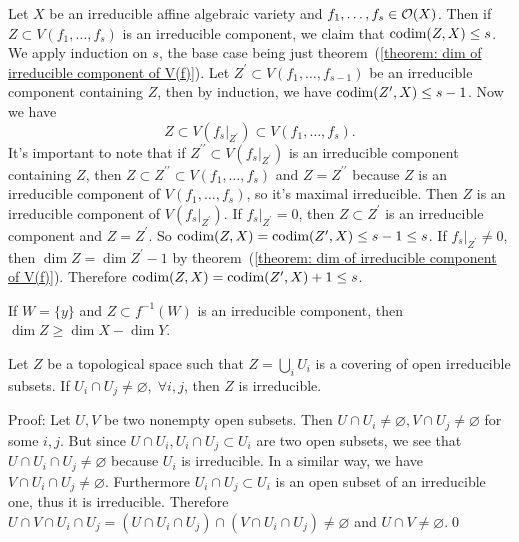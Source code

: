 \begin{remark}\label{remark: krull dimension generalized}
    Let $X$ be an irreducible affine algebraic variety and $f_1,\dots, f_s\in\mathcal{O}(X)$. Then if $Z\subset V(f_1,\dots, f_s)$
    is an irreducible component, we claim that $\text{codim}(Z,X)\leq s$. We apply induction on $s$, the base case being 
    just theorem~(\ref{theorem: dim of irreducible component of V(f)}). Let 
    $Z^\prime\subset V(f_1,\dots, f_{s-1})$ be an irreducible component containing $Z$, then by induction, we have 
    $\text{codim}(Z^\prime,X)\leq s-1$. Now we have 
    \begin{equation}
        Z \subset V(f_s|_{Z^\prime})\subset V(f_1,\dots, f_s).
    \end{equation}
    It's important to note that if $Z^{\prime\prime}\subset V(f_s|_{Z^\prime})$ is an irreducible component containing $Z$, then 
    $Z\subset Z^{\prime\prime}\subset V(f_1,\dots, f_s)$ and $Z=Z^{\prime\prime}$ because 
    $Z$ is an irreducible component of $V(f_1,\dots, f_s)$, so it's maximal irreducible. Then 
    $Z$ is an irreducible component of $V(f_s|_{Z^\prime})$.  
    If $f_s|_{Z^\prime}=0$, then $Z\subset Z^\prime$ is an irreducible component and $Z=Z^\prime$. So 
    $\text{codim}(Z,X)=\text{codim}(Z^\prime,X)\leq s-1\leq s$. If $f_s|_{Z^\prime}\neq0$, then 
    $\dim Z = \dim Z^\prime -1$ by theorem~(\ref{theorem: dim of irreducible component of V(f)}). Therefore 
    $\text{codim}(Z,X)=\text{codim}(Z^\prime,X)+1\leq s$.
\end{remark}

\begin{dang}
    \begin{corollary}
        If $W=\{y\}$ and $Z\subset f^{-1}(W)$ is an irreducible component, then 
        $\dim Z\geq \dim X - \dim Y$.
    \end{corollary}
\end{dang}

\begin{dang}
    \begin{lemma}
        Let $Z$ be a topological space such that $Z=\bigcup_i U_i$ is a covering of open irreducible subsets. 
        If $U_i\cap U_j\neq\varnothing,\;\forall i,j$, then $Z$ is irreducible.
    \end{lemma}
\end{dang}
Proof: Let $U,V$ be two nonempty open subsets. Then $U\cap U_i\neq\varnothing, V\cap U_j\neq\varnothing$ for some 
$i,j$. But since $U\cap U_i, U_i\cap U_j\subset U_i$ are two open subsets, we see that 
$U\cap U_i\cap U_j\neq\varnothing$ because $U_i$ is irreducible. In a similar way, we have 
$V\cap U_i\cap U_j\neq\varnothing$. Furthermore $U_i\cap U_j\subset U_i$ is an open subset of an irreducible one, thus 
it is irreducible. Therefore $U\cap V\cap U_i\cap U_j=(U\cap U_i\cap U_j)\cap (V\cap U_i\cap U_j)\neq\varnothing$ 
and $U\cap V\neq\varnothing$.\qed 


